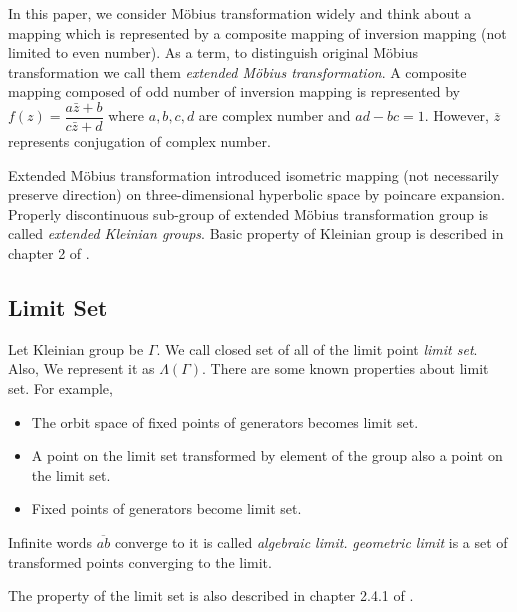 In this paper, we consider M\"obius transformation widely and
think about a mapping which is represented by a composite mapping of
inversion mapping (not limited to even number).
As a term, to distinguish original M\"obius transformation
we call them \textit{extended M\"obius transformation}.
A composite mapping composed of odd number of inversion mapping
is represented by $f(z)=\dfrac{a{\bar{z}}+b}{c{\bar{z}}+d}$ where
$a, b, c, d$ are complex number and $ad-bc = 1$.
However, $\overline{z}$ represents conjugation of complex number.

Extended M\"obius transformation introduced isometric mapping (not
necessarily preserve direction) on three-dimensional hyperbolic space by
poincare expansion.
Properly discontinuous sub-group of extended M\"obius transformation group
is called \textit{extended Kleinian groups}.
Basic property of Kleinian group is described in chapter 2 of \cite{marden_2016}.

\subsection{Limit Set}

Let Kleinian group be $\Gamma$.
We call closed set of all of the limit point \textit{limit set}.
Also, We represent it as $\Lambda(\Gamma)$.
There are some known properties about limit set.
For example,
\begin{itemize}
 \item The orbit space of fixed points of generators becomes limit set.
 \item A point on the limit set transformed by element of the group 
       also a point on the limit set.
 \item Fixed points of generators become limit set.
\end{itemize}

Infinite words $\overline{ab}$ converge to it is called \textit{algebraic limit.}
\textit{geometric limit} is a set of transformed points converging to
the limit.

The property of the limit set is also described in chapter 2.4.1 of
\cite{marden_2016}.



